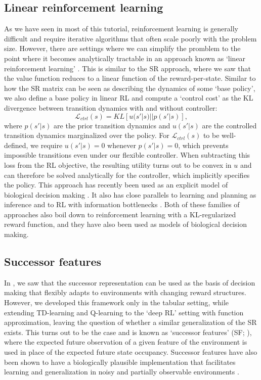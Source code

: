 \subsection*{Linear reinforcement learning}
As we have seen in most of this tutorial, reinforcement learning is generally difficult and require iterative algorithms that often scale poorly with the problem size.
However, there are settings where we can simplify the promblem to the point where it becomes analytically tractable in an approach known as `linear reinforcement learning' \citep{todorov2006linearly, todorov2009efficient}.
This is similar to the SR approach, where we saw that the value function reduces to a linear function of the reward-per-state.
Similar to how the SR matrix can be seen as describing the dynamics of some `base policy', we also define a base policy in linear RL and compute a `control cost' as the KL divergence between transition dynamics with and without controller:
\begin{equation}
    \mathcal{L}_{ctrl}(s) = KL \left [ u(s' | s) || p(s'|s) \right ],
\end{equation}
where $p(s' | s)$ are the prior transition dynamics and $u(s' | s)$ are the controlled transition dynamics marginalized over the policy.
For $\mathcal{L}_{ctrl}(s)$ to be well-defined, we require $u(s'|s) = 0$ whenever $p(s'|s) = 0$, which prevents impossible transitions even under our flexible controller.
When subtracting this loss from the RL objective, the resulting utility turns out to be convex in $u$ and can therefore be solved analytically for the controller, which implicitly specifies the policy.
This approach has recently been used as an explicit model of biological decision making \citep{piray2021linear}.
It also has close parallels to learning and planning as inference \citep{levine2018reinforcement, solway2012goal,botvinick2012planning} and to RL with information bottlenecks \citep{lai2021policy}.
Both of these families of approaches also boil down to reinforcement learning with a KL-regularized reward function, and they have also been used as models of biological decision making.

\subsection*{Successor features}
In , we saw that the successor representation can be used as the basis of decision making that flexibly adapts to environments with changing reward structures.
However, we developed this framework only in the tabular setting, while extending TD-learning and Q-learning to the `deep RL' setting with function approximation, leaving the question of whether a similar generalization of the SR exists.
This turns out to be the case and is known as `successor features' (SF; \citealp{barreto2017successor}), where the expected future observation of a given feature of the environment is used in place of the expected future state occupancy.
Successor features have also been shown to have a biologically plausible implementation that facilitates learning and generalization in noisy and partially observable environments \citep{vertes2019neurally}.

